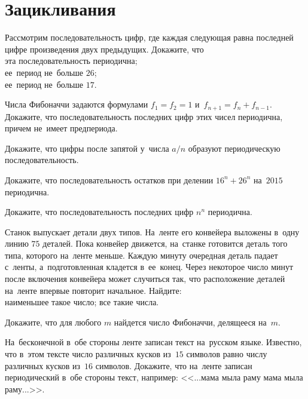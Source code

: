 
\section*{Зацикливания}


\begin{problems}

\item
Рассмотрим последовательность цифр, где каждая следующая равна последней цифре
произведения двух предыдущих.
Докажите, что
\\
\sp эта последовательность периодична;
\\
\sp ее~период не~больше $26$;
\\
\sp ее~период не~больше $17$.

\item
Числа Фибоначчи задаются формулами
$f_1 = f_2 = 1$ и~$f_{n + 1} = f_n + f_{n - 1}$.
Докажите, что последовательность последних цифр этих чисел периодична, причем
не~имеет предпериода.

\item
Докажите, что цифры после запятой у~числа $a / n$ образуют периодическую
последовательность.

\item
Докажите, что последовательность остатков при делении $16^n + 26^n$ на~$2015$
периодична.

\item
Докажите, что последовательность последних цифр $n^n$ периодична.

\item
Станок выпускает детали двух типов.
На~ленте его конвейера выложены в~одну линию $75$ деталей.
Пока конвейер движется, на~станке готовится деталь того типа, которого на~ленте
меньше.
Каждую минуту очередная деталь падает с~ленты, а~подготовленная кладется
в~ее~конец.
Через некоторое число минут после включения конвейера может случиться так, что
расположение деталей на~ленте впервые повторит начальное.
Найдите:
\\
\sp наименьшее такое число;
\quad
\sp все такие числа.

\item
Докажите, что для любого $m$ найдется число Фибоначчи, делящееся на~$m$.

\item
На~бесконечной в~обе стороны ленте записан текст на~русском языке.
Известно, что в~этом тексте число различных кусков из~$15$ символов равно числу
различных кусков из~$16$ символов.
Докажите, что на~ленте записан периодический в~обе стороны текст, например:
<<...мама мыла раму мама мыла раму...>>.


\end{problems}
